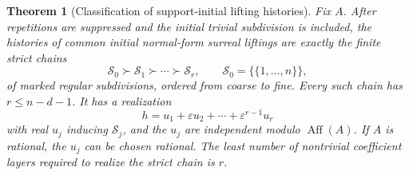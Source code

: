 \documentclass[11pt,a4paper]{article}
\numberwithin{equation}{section}
\newtheorem{theorem}{Theorem}[section]
\theoremstyle{plain}
\newcommand{\eps}{\varepsilon}
\newcommand{\Aff}{\operatorname{Aff}}
\begin{document}
\begin{theorem}[Classification of support-initial lifting histories]\label{poly:ts:thm:chain}
Fix $A$. After repetitions are suppressed and the initial trivial
subdivision is included, the histories of common initial normal-form
surreal liftings are exactly the finite strict chains
\begin{equation}\label{poly:ts:eq:chain}
 \mathcal S_0 \succ \mathcal S_1 \succ\cdots\succ\mathcal S_r,
 \qquad \mathcal S_0=\{\{1,\ldots,n\}\},
\end{equation}
of marked regular subdivisions, ordered from coarse to fine.
Every such chain has $r\le n-d-1$. It has a realization
\begin{equation}\label{poly:ts:eq:chain-height}
 h=u_1+\eps u_2+\cdots+\eps^{r-1}u_r
\end{equation}
with real $u_j$ inducing $\mathcal S_j$, and the $u_j$ are independent
modulo $\Aff(A)$. If $A$ is rational, the $u_j$ can be chosen rational.
The least number of nontrivial coefficient layers required to realize
the strict chain is $r$.
\end{theorem}
\end{document}
